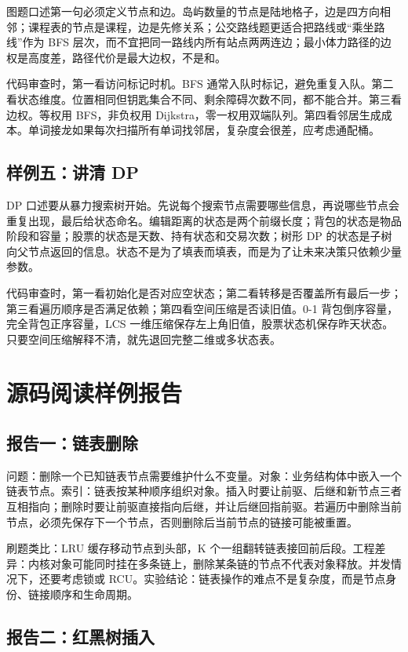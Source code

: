 图题口述第一句必须定义节点和边。岛屿数量的节点是陆地格子，边是四方向相邻；课程表的节点是课程，边是先修关系；公交路线题更适合把路线或“乘坐路线”作为 BFS 层次，而不宜把同一路线内所有站点两两连边；最小体力路径的边权是高度差，路径代价是最大边权，不是和。

代码审查时，第一看访问标记时机。BFS 通常入队时标记，避免重复入队。第二看状态维度。位置相同但钥匙集合不同、剩余障碍次数不同，都不能合并。第三看边权。等权用 BFS，非负权用 Dijkstra，零一权用双端队列。第四看邻居生成成本。单词接龙如果每次扫描所有单词找邻居，复杂度会很差，应考虑通配桶。

\subsection{样例五：讲清 DP}

DP 口述要从暴力搜索树开始。先说每个搜索节点需要哪些信息，再说哪些节点会重复出现，最后给状态命名。编辑距离的状态是两个前缀长度；背包的状态是物品阶段和容量；股票的状态是天数、持有状态和交易次数；树形 DP 的状态是子树向父节点返回的信息。状态不是为了填表而填表，而是为了让未来决策只依赖少量参数。

代码审查时，第一看初始化是否对应空状态；第二看转移是否覆盖所有最后一步；第三看遍历顺序是否满足依赖；第四看空间压缩是否读旧值。0-1 背包倒序容量，完全背包正序容量，LCS 一维压缩保存左上角旧值，股票状态机保存昨天状态。只要空间压缩解释不清，就先退回完整二维或多状态表。

\section{源码阅读样例报告}

\subsection{报告一：链表删除}

问题：删除一个已知链表节点需要维护什么不变量。对象：业务结构体中嵌入一个链表节点。索引：链表按某种顺序组织对象。插入时要让前驱、后继和新节点三者互相指向；删除时要让前驱直接指向后继，并让后继回指前驱。若遍历中删除当前节点，必须先保存下一个节点，否则删除后当前节点的链接可能被重置。

刷题类比：LRU 缓存移动节点到头部，K 个一组翻转链表接回前后段。工程差异：内核对象可能同时挂在多条链上，删除某条链的节点不代表对象释放。并发情况下，还要考虑锁或 RCU。实验结论：链表操作的难点不是复杂度，而是节点身份、链接顺序和生命周期。

\subsection{报告二：红黑树插入}

